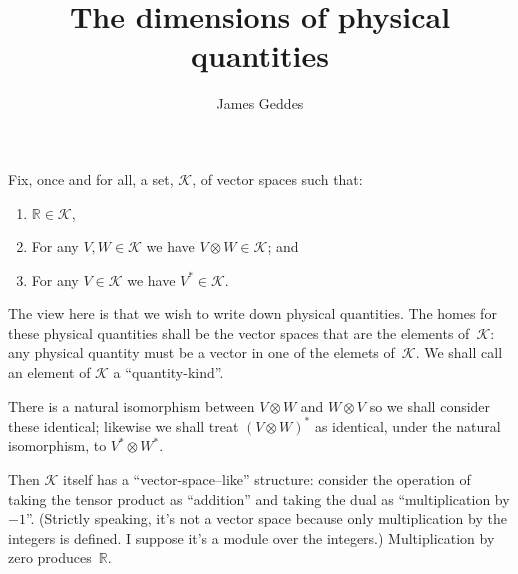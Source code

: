 \documentclass[a4paper, twocolumn, 10pt]{article}
\title{The dimensions of physical quantities}
\author{James Geddes}
\newcommand{\K}{\mathcal{K}}
\newcommand{\reals}{\mathbb{R}}
\begin{document}
\maketitle

Fix, once and for all, a set, $\K$, of vector spaces such that:
\begin{enumerate}
\item $\reals\in\K$,
\item For any $V, W\in\K$ we have $V\otimes W\in\K$; and
\item For any $V\in\K$ we have $V^*\in\K$.
\end{enumerate}

The view here is that we wish to write down physical quantities. The homes for
these physical quantities shall be the vector spaces that are the elements
of~$\K$: any physical quantity must be a vector in one of the elemets
of~$\K$. We shall call an element of $\K$ a ``quantity-kind''.

There is a natural isomorphism between $V\otimes W$ and $W\otimes V$ so we shall
consider these identical; likewise we shall treat $(V\otimes W)^*$ as identical,
under the natural isomorphism, to $V^*\otimes W^*$. 

Then $\K$ itself has a ``vector-space--like'' structure: consider the operation
of taking the tensor product as ``addition'' and taking the dual as
``multiplication by $-1$''. (Strictly speaking, it's not a vector space because
only multiplication by the integers is defined. I suppose it's a module over the
integers.) Multiplication by zero produces~$\reals$. 



 
\end{document}
